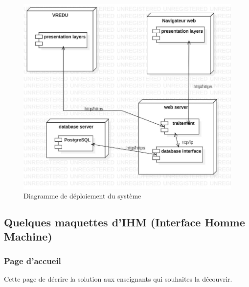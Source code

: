 \begin{figure}[H]
	\centering
	\includegraphics[width=1\textwidth]{img/dd}
	\caption{Diagramme de déploiement du système}
	\label{fig:mesh1}
\end{figure}

\subsection{Quelques maquettes d'IHM (Interface Homme Machine)}

\subsubsection{Page d'accueil}

Cette page de décrire la solution aux enseignants qui souhaites la découvrir.

